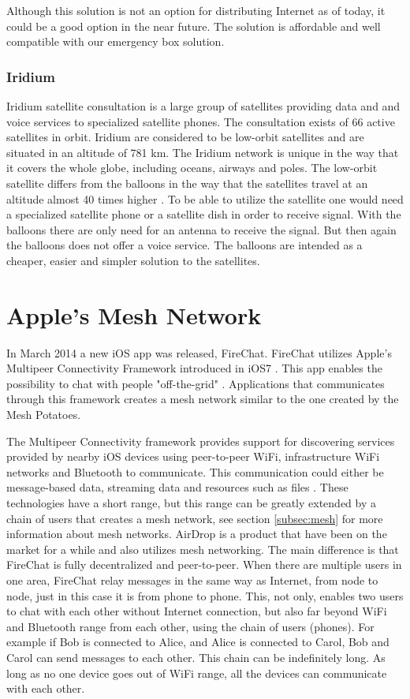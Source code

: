 Although this solution is not an option for distributing Internet as of today, it could be a good option in the near future. The solution is affordable and well compatible with our emergency box solution.

\subsubsection{Iridium}
Iridium satellite consultation is a large group of satellites providing data and and voice services to specialized satellite phones. The consultation exists of 66 active satellites in orbit. Iridium are considered to be low-orbit satellites and are situated in an altitude of 781 km. The Iridium network is unique in the way that it covers the whole globe, including oceans, airways and poles. The low-orbit satellite differs from the balloons in the way that the satellites travel at an altitude almost 40 times higher \cite{iridium}. To be able to utilize the satellite one would need a specialized satellite phone or a satellite dish in order to receive signal. With the balloons there are only need for an antenna to receive the signal. But then again the balloons does not offer a voice service. The balloons are intended as a cheaper, easier and simpler solution to the satellites.                                         

\section{Apple's Mesh Network}
In March 2014 a new iOS app was released, FireChat. FireChat utilizes Apple's Multipeer Connectivity Framework introduced in iOS7 \cite{appleMesh}. This app enables the possibility to chat with people "off-the-grid" \cite{fireChat}. Applications that communicates through this framework creates a mesh network similar to the one created by the Mesh Potatoes. 

The Multipeer Connectivity framework provides support for discovering services provided by nearby iOS devices using peer-to-peer WiFi, infrastructure WiFi networks and Bluetooth to communicate. This communication could either be message-based data, streaming data and resources such as files \cite{multipeer}. These technologies have a short range, but this range can be greatly extended by a chain of users that creates a mesh network, see section \ref{subsec:mesh} for more information about mesh networks. AirDrop is a product that have been on the market for a while and also utilizes mesh networking. The main difference is that FireChat is fully decentralized and peer-to-peer. When there are multiple users in one area, FireChat relay messages in the same way as Internet, from node to node, just in this case it is from phone to phone.  This, not only, enables two users to chat with each other without Internet connection, but also far beyond WiFi and Bluetooth range from each other, using the chain of users (phones). For example if Bob is connected to Alice, and Alice is connected to Carol, Bob and Carol can send messages to each other. This chain can be indefinitely long. As long as no one device goes out of WiFi range, all the devices can communicate with each other. 

